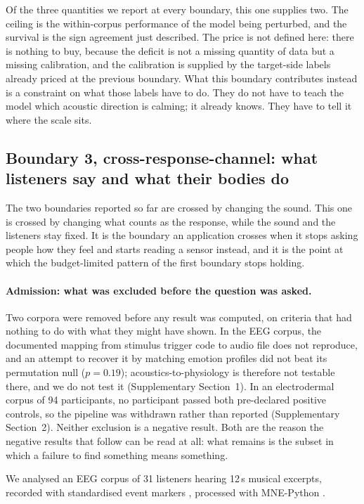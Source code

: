 Of the three quantities we report at every boundary, this one supplies two. The
ceiling is the within-corpus performance of the model being perturbed, and the
survival is the sign agreement just described. The price is not defined here: there
is nothing to buy, because the deficit is not a missing quantity of data but a
missing calibration, and the calibration is supplied by the target-side labels
already priced at the previous boundary. What this boundary contributes instead is
a constraint on what those labels have to do. They do not have to teach the model
which acoustic direction is calming; it already knows. They have to tell it where
the scale sits.

\subsection*{Boundary 3, cross-response-channel: what listeners say and what their
bodies do}

The two boundaries reported so far are crossed by changing the sound. This one is
crossed by changing what counts as the response, while the sound and the listeners
stay fixed. It is the boundary an application crosses when it stops asking people
how they feel and starts reading a sensor instead, and it is the point at which the
budget-limited pattern of the first boundary stops holding.

\paragraph{Admission: what was excluded before the question was asked.}
Two corpora were removed before any result was computed, on criteria that had
nothing to do with what they might have shown. In the EEG corpus, the documented
mapping from stimulus trigger code to audio file does not reproduce, and an attempt
to recover it by matching emotion profiles did not beat its permutation null
($p = 0.19$); acoustics-to-physiology is therefore not testable there, and we do not
test it (Supplementary Section~1). In an electrodermal corpus of 94 participants,
no participant passed both pre-declared positive controls, so the pipeline was
withdrawn rather than reported (Supplementary Section~2). Neither exclusion is a
negative result. Both are the reason the negative results that follow can be read
at all: what remains is the subset in which a failure to find something means
something.

We analysed an EEG corpus of 31 listeners hearing 12\,s musical excerpts, recorded
with standardised event markers
\citep{daly2018data,gorgolewski2016,pernet2019}, processed with MNE-Python
\citep{gramfort2013}.

